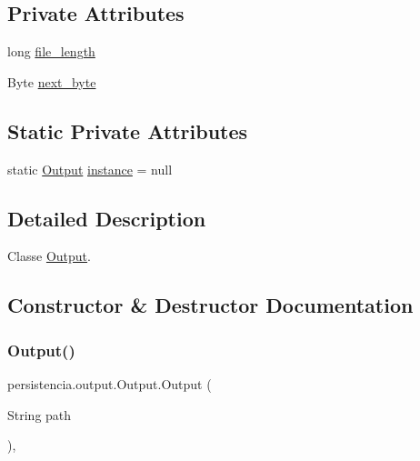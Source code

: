 \subsection*{Private Attributes}
\begin{DoxyCompactItemize}
\item 
long \hyperlink{classpersistencia_1_1output_1_1Output_a028761929614fdc2b88f9ebe0e2313ef}{file\+\_\+length}
\item 
Byte \hyperlink{classpersistencia_1_1output_1_1Output_aca83082ef84ec2e169b6fa34618d0773}{next\+\_\+byte}
\end{DoxyCompactItemize}
\subsection*{Static Private Attributes}
\begin{DoxyCompactItemize}
\item 
static \hyperlink{classpersistencia_1_1output_1_1Output}{Output} \hyperlink{classpersistencia_1_1output_1_1Output_aaadf14a03c4f3f585170abdc7524b63d}{instance} = null
\end{DoxyCompactItemize}


\subsection{Detailed Description}
Classe \hyperlink{classpersistencia_1_1output_1_1Output}{Output}. 

\subsection{Constructor \& Destructor Documentation}
\mbox{\label{classpersistencia_1_1output_1_1Output_acbb70ea9eabb2a6d0b2d7bd2f3c9009a}} 
\subsubsection{\texorpdfstring{Output()}{Output()}}
{\footnotesize\ttfamily persistencia.\+output.\+Output.\+Output (\begin{DoxyParamCaption}\item[{String}]{path }\end{DoxyParamCaption})\hspace{0.3cm}{\ttfamily [inline]}, {\ttfamily [private]}}



